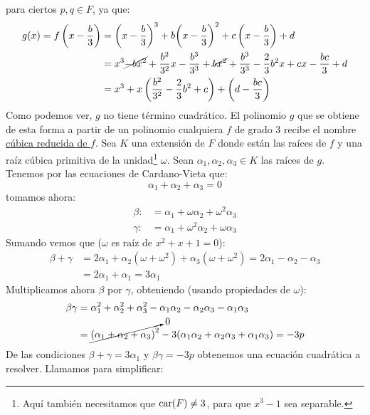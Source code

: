 para ciertos $p,q\in F$, ya que: 
\begin{align*}
    g(x) = f\left(x-\frac{b}{3}\right) &= {\left(x-\frac{b}{3}\right)}^{3} + b{\left(x-\frac{b}{3}\right)}^{2} + c\left(x-\frac{b}{3}\right) + d \\
                                &= x^3 \cancel{-bx^2} + \frac{b^2}{3^2}x - \frac{b^3}{3^3} + \cancel{bx^2} + \frac{b^3}{3^3} - \frac{2}{3}b^2x + cx - \frac{bc}{3} + d \\
                                &= x^3 + x\left(\frac{b^2}{3^2} - \frac{2}{3}b^2 + c\right) + \left(d-\frac{bc}{3}\right)
\end{align*}
Como podemos ver, $g$ no tiene término cuadrático. El polinomio $g$ que se obtiene de esta forma a partir de un polinomio cualquiera $f$ de grado 3 recibe el nombre \underline{cúbica reducida de $f$}. Sea $K$ una extensión de $F$ donde están las raíces de $f$ y una raíz cúbica primitiva de la unidad\footnote{Aquí también necesitamos que $\operatorname{car}(F)\neq 3$, para que $x^3-1$ sea separable.} $\omega$. Sean $\alpha_1,\alpha_2,\alpha_3\in K$ las raíces de $g$. Tenemos por las ecuaciones de Cardano-Vieta que:
\begin{equation*}
    \alpha_1 + \alpha_2 + \alpha_3 = 0
\end{equation*}
tomamos ahora:
\begin{align*}
    \beta :&= \alpha_1 + \omega \alpha_2 + \omega^2\alpha_3 \\
    \gamma :&= \alpha_1 + \omega^2\alpha_2 + \omega\alpha_3
\end{align*}
Sumando vemos que ($\omega$ es raíz de $x^2+x+1=0$):
\begin{align*}
    \beta + \gamma &= 2\alpha_1 + \alpha_2(\omega + \omega^2) + \alpha_3(\omega+\omega^2) = 2\alpha_1 -\alpha_2 - \alpha_3 \\
                   &= 2\alpha_1 + \alpha_1 = 3\alpha_1
\end{align*}
Multiplicamos ahora $\beta$ por $\gamma$, obteniendo (usando propiedades de $\omega$): %
\begin{align*}
    \beta\gamma &= \alpha_1^2 + \alpha_2^2 + \alpha_3^2 - \alpha_1\alpha_2 - \alpha_2\alpha_3 - \alpha_1\alpha_3  \\
                &= \cancelto{0}{{(\alpha_1 + \alpha_2 + \alpha_3)}^{2}} - 3 (\alpha_1\alpha_2 + \alpha_2\alpha_3 + \alpha_1\alpha_3) = -3p
\end{align*}
De las condiciones $\beta+\gamma=3\alpha_1$ y $\beta\gamma = -3p$ obtenemos una ecuación cuadrática a resolver. Llamamos para simplificar:
